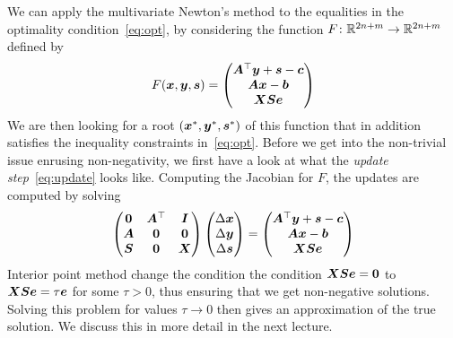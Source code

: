 We can apply the multivariate Newton's method to the equalities in the optimality condition~\eqref{eq:opt}, by considering the function $F\colon \mathbb{R}^{2n+m}\to \mathbb{R}^{2n+m}$ defined by
\begin{equation*}
 F(\bm{x},\bm{y},\bm{s}) = \begin{pmatrix}
                               \bm{A}^{\top}\bm{y}+\bm{s}-\bm{c}\\
                               \bm{A}\bm{x}-\bm{b}\\
                               \bm{X}\bm{S}\bm{e} 
                              \end{pmatrix}
\end{equation*}
We are then looking for a root $(\bm{x}^*,\bm{y}^*,\bm{s}^*)$ of this function that in addition satisfies the inequality constraints in~\eqref{eq:opt}. Before we get into the non-trivial issue enrusing non-negativity, we first have a look at what the {\em update step}~\eqref{eq:update} looks like. Computing the Jacobian for $F$, the updates are computed by solving
\begin{equation*}
 \begin{pmatrix}
  \bm{0} & \bm{A}^{\top} & \bm{I} \\
  \bm{A} & \bm{0} & \bm{0} \\
  \bm{S} & \bm{0} & \bm{X}
 \end{pmatrix}
\begin{pmatrix} \Delta\bm{x}\\ \Delta \bm{y}\\ \Delta\bm{s} \end{pmatrix} = \begin{pmatrix}
                               \bm{A}^{\top}\bm{y}+\bm{s}-\bm{c}\\
                               \bm{A}\bm{x}-\bm{b}\\
                               \bm{X}\bm{S}\bm{e} 
                              \end{pmatrix}
\end{equation*}
Interior point method change the condition the condition $\bm{X}\bm{S}\bm{e}=\bm{0}$ to $\bm{X}\bm{S}\bm{e}=\tau \bm{e}$ for some $\tau >0$, thus ensuring that we get non-negative solutions. Solving this problem for values $\tau\to 0$ then gives an approximation of the true solution. We discuss this in more detail in the next lecture.



